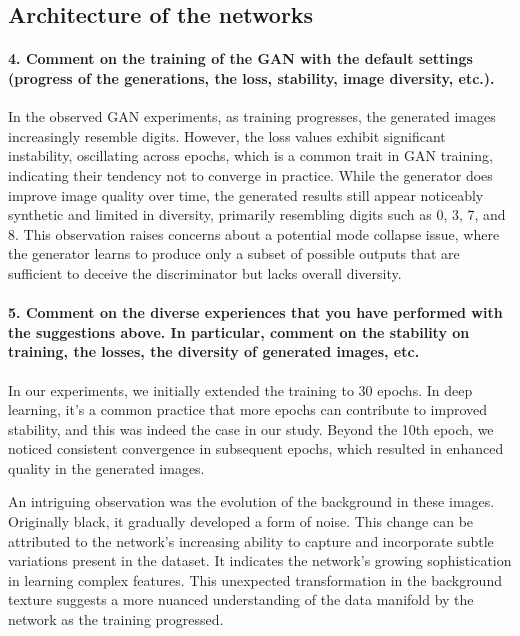 \subsection{Architecture of the networks}

\paragraph*{4. Comment on the training of the GAN with the default settings (progress of the generations, the loss, stability, image diversity, etc.).}

In the observed GAN experiments, as training progresses, the generated images increasingly resemble digits. However, the loss values exhibit significant instability, oscillating across epochs, which is a common trait in GAN training, indicating their tendency not to converge in practice. While the generator does improve image quality over time, the generated results still appear noticeably synthetic and limited in diversity, primarily resembling digits such as 0, 3, 7, and 8. This observation raises concerns about a potential mode collapse issue, where the generator learns to produce only a subset of possible outputs that are sufficient to deceive the discriminator but lacks overall diversity.


\paragraph*{5. Comment on the diverse experiences that you have performed with the suggestions above. In particular, comment on the stability on training, the losses, the diversity of generated images, etc.}

In our experiments, we initially extended the training to 30 epochs. In deep learning, it's a common practice that more epochs can contribute to improved stability, and this was indeed the case in our study. Beyond the 10th epoch, we noticed consistent convergence in subsequent epochs, which resulted in enhanced quality in the generated images.

An intriguing observation was the evolution of the background in these images. Originally black, it gradually developed a form of noise. This change can be attributed to the network's increasing ability to capture and incorporate subtle variations present in the dataset. It indicates the network's growing sophistication in learning complex features. This unexpected transformation in the background texture suggests a more nuanced understanding of the data manifold by the network as the training progressed.

